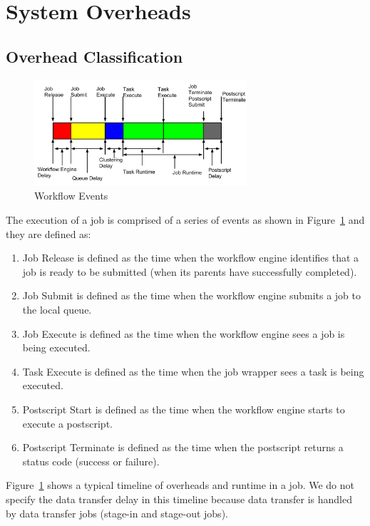 \section{System Overheads}
\label{sec:overheads}
\subsection{Overhead Classification}


\begin{figure}[h!]
	\centering
    \includegraphics[width=0.7\textwidth]{figures/model/Job_Timeline.pdf}
    \caption{Workflow Events}
    \label{fig:model_overhead}
\end{figure}


The execution of a job is comprised of a series of events as shown in Figure~\ref{fig:model_overhead} and they are defined as:
\begin{enumerate}
\item Job Release is defined as the time when the workflow engine identifies that a job is ready to be submitted (when its parents have successfully completed). 
\item Job Submit is defined as the time when the workflow engine submits a job to the local queue. 
\item Job Execute is defined as the time when the workflow engine sees a job is being executed. 
\item Task Execute is defined as the time when the job wrapper sees a task is being executed. 

\item Postscript Start is defined as the time when the workflow engine starts to execute a postscript. 
\item Postscript Terminate is defined as the time when the postscript returns a status code (success or failure). 
\end{enumerate}

Figure~\ref{fig:model_overhead} shows a typical timeline of overheads and runtime in a job. We do not specify the data transfer delay in this timeline because data transfer is handled by data transfer jobs (stage-in and stage-out jobs). 

